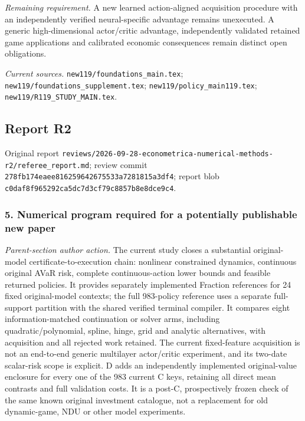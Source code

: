 \par\emph{Remaining requirement.} A new learned action-aligned acquisition procedure with an independently verified neural-specific advantage remains unexecuted. A generic high-dimensional actor/\allowbreak{}critic advantage, independently validated retained game applications and calibrated economic consequences remain distinct open obligations.

\par\emph{Current sources.} \nolinkurl{new119/foundations_main.tex}; \nolinkurl{new119/foundations_supplement.tex}; \nolinkurl{new119/policy_main119.tex}; \nolinkurl{new119/R119_STUDY_MAIN.tex}.

\subsection{Report R2}

Original report \nolinkurl{reviews/2026-09-28-econometrica-numerical-methods-r2/referee_report.md}; review commit \nolinkurl{278fb174eaee816259642675533a7281815a3df4}; report blob \nolinkurl{c0daf8f965292ca5dc7d3cf79c8857b8e8dce9c4}.

\subsubsection{5. Numerical program required for a potentially publishable new paper}

\emph{Parent-section author action.} The current study closes a substantial original-model certificate-to-execution chain: nonlinear constrained dynamics, continuous original AVaR risk, complete continuous-action lower bounds and feasible returned policies. It provides separately implemented Fraction references for 24 fixed original-model contexts; the full 983-policy reference uses a separate full-support partition with the shared verified terminal compiler. It compares eight information-matched continuation or solver arms, including quadratic/\allowbreak{}polynomial, spline, hinge, grid and analytic alternatives, with acquisition and all rejected work retained. The current fixed-feature acquisition is not an end-to-end generic multilayer actor/\allowbreak{}critic experiment, and its two-date scalar-risk scope is explicit. D adds an independently implemented original-value enclosure for every one of the 983 current C keys, retaining all direct mean contrasts and full validation costs. It is a post-C, prospectively frozen check of the same known original investment catalogue, not a replacement for old dynamic-game, NDU or other model experiments.

